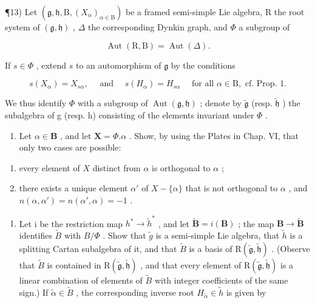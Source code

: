 ¶13) Let \((\mathfrak{g},\mathfrak{h},\mathrm{B},(X_{\alpha})_{\alpha\in\mathrm{B}})\) be a framed semi-simple Lie algebra, R the root system of \((\mathfrak{g},\mathfrak{h})\) , \(\Delta\) the corresponding Dynkin graph, and \(\varPhi\) a subgroup of

\[
\operatorname{Aut} (\mathrm{R}, \mathrm{B}) = \operatorname{Aut} (\Delta).
\]

If \(s \in \varPhi\) , extend \(s\) to an automorphism of \(\mathfrak{g}\) by the conditions

\[
s (X _ {\alpha}) = X _ {s \alpha}, \quad \text { and } \quad s (H _ {\alpha}) = H _ {s \alpha} \quad \text { for   all } \alpha \in \mathrm{B}, \text { cf.   Prop. } 1.
\]

We thus identify \(\varPhi\) with a subgroup of \(\operatorname{Aut}(\mathfrak{g},\mathfrak{h})\) ; denote by \(\tilde{\mathfrak{g}}\) (resp. \(\tilde{\mathfrak{h}}\) ) the subalgebra of g (resp. h) consisting of the elements invariant under \(\varPhi\) .

\begin{enumerate}
\def\labelenumi{\alph{enumi})}
\tightlist
\item
  Let \(\alpha \in \mathbf{B}\) , and let \(\mathbf{X} = \varPhi.\alpha\) . Show, by using the Plates in Chap. VI, that only two cases are possible:
\end{enumerate}

\begin{enumerate}
\def\labelenumi{(\roman{enumi})}
\item
  every element of \(X\) distinct from \(\alpha\) is orthogonal to \(\alpha\) ;
\item
  there exists a unique element \(\alpha'\) of \(X - \{\alpha\}\) that is not orthogonal to \(\alpha\) , and \(n(\alpha, \alpha') = n(\alpha', \alpha) = -1\) .
\end{enumerate}

\begin{enumerate}
\def\labelenumi{\alph{enumi})}
\setcounter{enumi}{1}
\tightlist
\item
  Let i be the restriction map \(h^{*} \to \tilde{h}^{*}\) , and let \(\tilde{\mathbf{B}} = i(\mathbf{B})\) ; the map \(\mathbf{B} \to \tilde{\mathbf{B}}\) identifies \(\tilde{B}\) with \(B/\varPhi\) . Show that \(\tilde{g}\) is a semi-simple Lie algebra, that \(\tilde{h}\) is a splitting Cartan subalgebra of it, and that \(\tilde{B}\) is a basis of \(\mathrm{R}(\tilde{\mathfrak{g}}, \tilde{\mathfrak{h}})\) . (Observe that \(\tilde{B}\) is contained in \(\mathrm{R}(\tilde{\mathfrak{g}}, \tilde{\mathfrak{h}})\) , and that every element of \(\mathrm{R}(\tilde{\mathfrak{g}}, \tilde{\mathfrak{h}})\) is a linear combination of elements of \(\tilde{B}\) with integer coefficients of the same sign.) If \(\tilde{\alpha} \in \tilde{B}\) , the corresponding inverse root \(H_{\tilde{\alpha}} \in \tilde{h}\) is given by
\end{enumerate}

